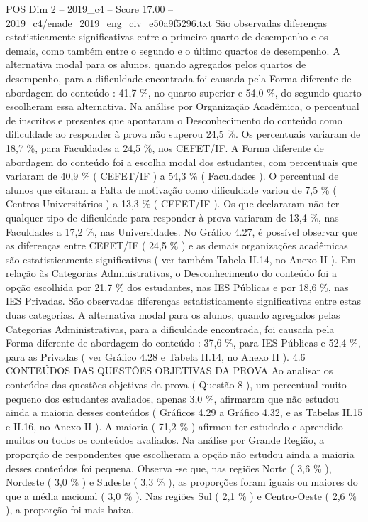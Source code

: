 \begin{textsample}{POS Dim 2 – 2019\_c4 – Score 17.00 – 2019\_c4/enade\_2019\_eng\_civ\_e50a9f5296.txt}
São observadas diferenças estatisticamente significativas entre o primeiro quarto de desempenho e os demais, como também entre o segundo e o último quartos de desempenho.
A alternativa modal para os alunos, quando agregados pelos quartos de desempenho, para a dificuldade encontrada foi causada pela Forma diferente de abordagem do conteúdo : 41,7 \%, no quarto superior e 54,0 \%, do segundo quarto escolheram essa alternativa.
Na análise por Organização Acadêmica, o percentual de inscritos e presentes que apontaram o Desconhecimento do conteúdo como dificuldade ao responder à prova não superou 24,5 \%.
Os percentuais variaram de 18,7 \%, para Faculdades a 24,5 \%, nos CEFET/IF.
A Forma diferente de abordagem do conteúdo foi a escolha modal dos estudantes, com percentuais que variaram de 40,9 \% ( CEFET/IF ) a 54,3 \% ( Faculdades ).
O percentual de alunos que citaram a Falta de motivação como dificuldade variou de 7,5 \% ( Centros Universitários ) a 13,3 \% ( CEFET/IF ).
Os que declararam não ter qualquer tipo de dificuldade para responder à prova variaram de 13,4 \%, nas Faculdades a 17,2 \%, nas Universidades.
No Gráfico 4.27, é possível observar que as diferenças entre CEFET/IF ( 24,5 \% ) e as demais organizações acadêmicas são estatisticamente significativas ( ver também Tabela II.14, no Anexo II ).
Em relação às Categorias Administrativas, o Desconhecimento do conteúdo foi a opção escolhida por 21,7 \% dos estudantes, nas IES Públicas e por 18,6 \%, nas IES Privadas.
São observadas diferenças estatisticamente significativas entre estas duas categorias.
A alternativa modal para os alunos, quando agregados pelas Categorias Administrativas, para a dificuldade encontrada, foi causada pela Forma diferente de abordagem do conteúdo : 37,6 \%, para IES Públicas e 52,4 \%, para as Privadas ( ver Gráfico 4.28 e Tabela II.14, no Anexo II ). 4.6 CONTEÚDOS DAS QUESTÕES OBJETIVAS DA PROVA Ao analisar os conteúdos das questões objetivas da prova ( Questão 8 ), um percentual muito pequeno dos estudantes avaliados, apenas 3,0 \%, afirmaram que não estudou ainda a maioria desses conteúdos ( Gráficos 4.29 a Gráfico 4.32, e as Tabelas II.15 e II.16, no Anexo II ).
A maioria ( 71,2 \% ) afirmou ter estudado e aprendido muitos ou todos os conteúdos avaliados.
Na análise por Grande Região, a proporção de respondentes que escolheram a opção não estudou ainda a maioria desses conteúdos foi pequena.
Observa -se que, nas regiões Norte ( 3,6 \% ), Nordeste ( 3,0 \% ) e Sudeste ( 3,3 \% ), as proporções foram iguais ou maiores do que a média nacional ( 3,0 \% ).
Nas regiões Sul ( 2,1 \% ) e Centro-Oeste ( 2,6 \% ), a proporção foi mais baixa.

\end{textsample}
